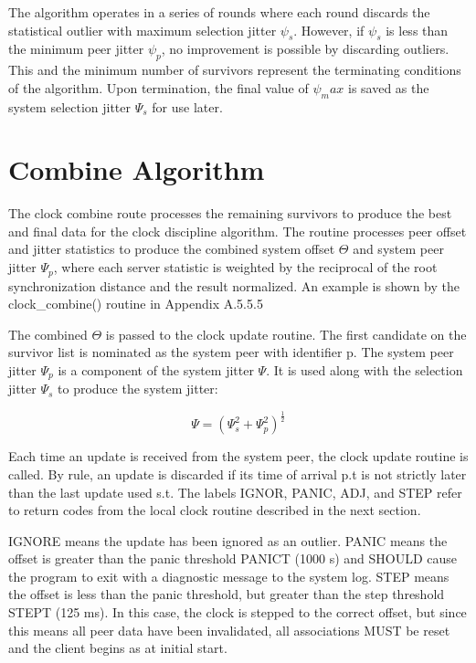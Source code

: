 The algorithm operates in a series of rounds where each round
discards the statistical outlier with maximum selection jitter $ \psi_s $.
However, if $ \psi_s $ is less than the minimum peer jitter $ \psi_p $, no
improvement is possible by discarding outliers.  This and the minimum
number of survivors represent the terminating conditions of the
algorithm.  Upon termination, the final value of $ \psi_max $ is saved as
the system selection jitter $ \Psi_s $ for use later.

\section{Combine Algorithm}

The clock combine route processes the remaining survivors to produce
the best and final data for the clock discipline algorithm.  The
routine processes peer offset and jitter statistics to produce the
combined system offset $ \Theta $ and system peer jitter $ \Psi_p $, where each
server statistic is weighted by the reciprocal of the root
synchronization distance and the result normalized.  An example is
shown by the clock\_combine() routine in Appendix A.5.5.5

The combined $ \Theta $ is passed to the clock update routine.  The first
candidate on the survivor list is nominated as the system peer with
identifier p.  The system peer jitter $ \Psi_p $ is a component of the
system jitter $ \Psi $.  It is used along with the selection jitter $ \Psi_s $
to produce the system jitter:

$$
\Psi = \left( \Psi_s^2 + \Psi_p^2 \right)^{\frac{1}{2}}
$$

Each time an update is received from the system peer, the clock
update routine is called.  By rule, an update is discarded if its
time of arrival p.t is not strictly later than the last update used
s.t.  The labels IGNOR, PANIC, ADJ, and STEP refer to return codes
from the local clock routine described in the next section.

IGNORE means the update has been ignored as an outlier.  PANIC means
the offset is greater than the panic threshold PANICT (1000 s) and
SHOULD cause the program to exit with a diagnostic message to the
system log.  STEP means the offset is less than the panic threshold,
but greater than the step threshold STEPT (125 ms).  In this case,
the clock is stepped to the correct offset, but since this means all
peer data have been invalidated, all associations MUST be reset and
the client begins as at initial start.


